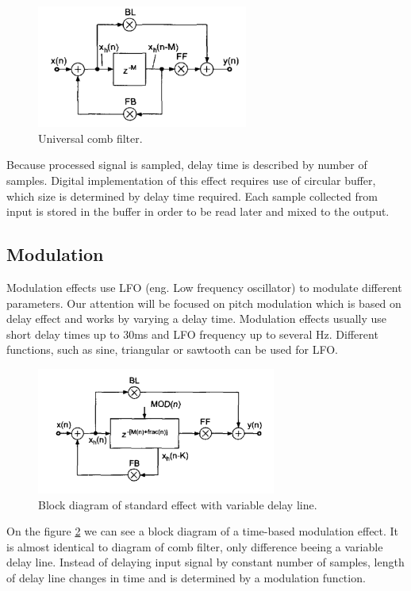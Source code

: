 \documentclass[a4paper,twoside,12pt]{book}
\begin{document}
\begin{figure}[H]
    \centering
    \includegraphics[width=0.618\textwidth]{images/comb}
    \caption{Universal comb filter\cite{Zolzer1}.}
    \label{fig:comb}
\end{figure}

Because processed signal is sampled,
delay time is described by number of samples.
Digital implementation of this effect requires use of circular buffer,
which size is determined by delay time required.
Each sample collected from input is stored in the buffer
in order to be read later and mixed to the output.

\subsection{Modulation}
Modulation effects use LFO (eng. Low frequency oscillator) to modulate different parameters.
Our attention will be focused on pitch modulation
which is based on delay effect and works by varying a delay time.
Modulation effects usually use short delay times up to 30ms
and LFO frequency up to several Hz.
Different functions, such as sine,
triangular or sawtooth can be used for LFO.

\begin{figure}[H]
    \centering
    \includegraphics[width=0.7\textwidth]{images/modulation}
    \caption{Block diagram of standard effect with variable delay line\cite{Zolzer1}.}
    \label{fig:Mod}
\end{figure}

On the figure \ref{fig:Mod} we can see a block diagram of a
time-based modulation effect.
It is almost identical to diagram of comb filter,
only difference beeing a variable delay line.
Instead of delaying input signal by constant number of samples,
length of delay line changes in time
and is determined by a modulation function.
\end{document}
